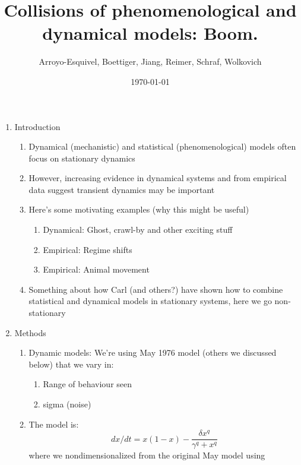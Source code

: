 \documentclass[11pt,letter]{article}
\begin{document}

\renewcommand{\refname}{\CHead{}}

\title{Collisions of phenomenological and dynamical models: Boom.}
\author{Arroyo-Esquivel, Boettiger, Jiang, Reimer, Schraf, Wolkovich}
\date{\today}
\maketitle

\begin{enumerate}
\item Introduction
\begin{enumerate} %
\item Dynamical (mechanistic) and statistical (phenomenological) models often focus on stationary dynamics 
\item However, increasing evidence in dynamical systems and from empirical data suggest transient dynamics may be important
\item Here's some motivating examples (why this might be useful)
\begin{enumerate}
\item Dynamical: Ghost, crawl-by and other exciting stuff
\item Empirical: Regime shifts
\item Empirical: Animal movement 
\end{enumerate}
\item Something about how Carl (and others?) have shown how to combine statistical and dynamical models in stationary systems, here we go non-stationary
\end{enumerate}
\item Methods
\begin{enumerate}
\item Dynamic models: We're using May 1976 model (others we discussed below) that we vary in:
\begin{enumerate}
\item Range of behaviour seen
\item sigma (noise)
\end{enumerate}
\item The model is:
\[ dx/dt = x(1-x) - \frac{\delta x^q}{\gamma^q + x^q} \]
where we nondimensionalized from the original May model using

\end{enumerate}
\end{enumerate}
\end{document}
